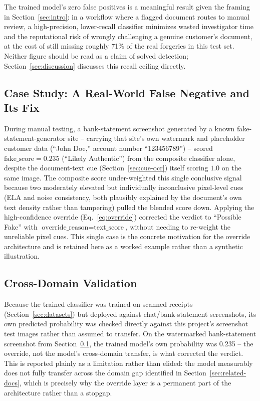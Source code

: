 \documentclass[conference]{IEEEtran}
\begin{document}
The trained model's zero false positives is a meaningful result given the
framing in Section~\ref{sec:intro}: in a workflow where a flagged document
routes to manual review, a high-precision, lower-recall classifier minimizes
wasted investigator time and the reputational risk of wrongly challenging a
genuine customer's document, at the cost of still missing roughly 71\% of the
real forgeries in this test set. Neither figure should be read as a claim of
solved detection; Section~\ref{sec:discussion} discusses this recall ceiling
directly.

\subsection{Case Study: A Real-World False Negative and Its Fix}
\label{sec:case-study}
During manual testing, a bank-statement screenshot generated by a known
fake-statement-generator site -- carrying that site's own watermark and
placeholder customer data (``John Doe,'' account number ``123456789'') --
scored $\text{fake\_score}=0.235$ (``Likely Authentic'') from the composite
classifier alone, despite the document-text cue
(Section~\ref{sec:cue-ocr}) itself scoring $1.0$ on the same image. The
composite score under-weighted this single conclusive signal because two
moderately elevated but individually inconclusive pixel-level cues (ELA and
noise consistency, both plausibly explained by the document's own text
density rather than tampering) pulled the blended score down. Applying the
high-confidence override (Eq.~\ref{eq:override}) corrected the verdict to
``Possible Fake'' with $\text{override\_reason}=\text{text\_score}$, without
needing to re-weight the unreliable pixel cues. This single case is the
concrete motivation for the override architecture and is retained here as a
worked example rather than a synthetic illustration.

\subsection{Cross-Domain Validation}
Because the trained classifier was trained on scanned receipts
(Section~\ref{sec:datasets}) but deployed against chat/bank-statement
screenshots, its own predicted probability was checked directly against this
project's screenshot test images rather than assumed to transfer. On the
watermarked bank-statement screenshot from Section~\ref{sec:case-study}, the
trained model's own probability was 0.235 -- the override, not the model's
cross-domain transfer, is what corrected the verdict. This is reported
plainly as a limitation rather than elided: the model measurably does not
fully transfer across the domain gap identified in
Section~\ref{sec:related-docs}, which is precisely why the override layer is
a permanent part of the architecture rather than a stopgap.
\end{document}

